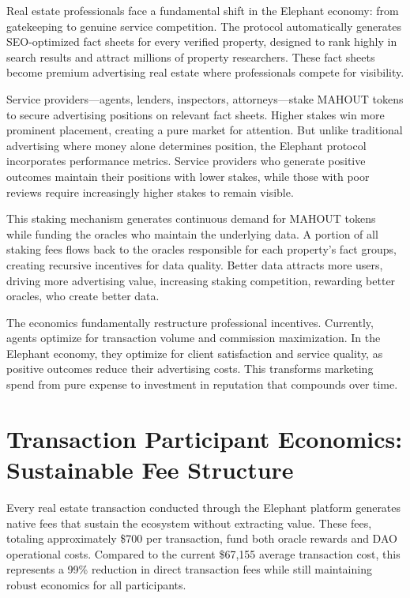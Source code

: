 Real estate professionals face a fundamental shift in the Elephant economy: from gatekeeping to genuine service competition. The protocol automatically generates SEO-optimized fact sheets for every verified property, designed to rank highly in search results and attract millions of property researchers. These fact sheets become premium advertising real estate where professionals compete for visibility.

Service providers—agents, lenders, inspectors, attorneys—stake MAHOUT tokens to secure advertising positions on relevant fact sheets. Higher stakes win more prominent placement, creating a pure market for attention. But unlike traditional advertising where money alone determines position, the Elephant protocol incorporates performance metrics. Service providers who generate positive outcomes maintain their positions with lower stakes, while those with poor reviews require increasingly higher stakes to remain visible.

This staking mechanism generates continuous demand for MAHOUT tokens while funding the oracles who maintain the underlying data. A portion of all staking fees flows back to the oracles responsible for each property's fact groups, creating recursive incentives for data quality. Better data attracts more users, driving more advertising value, increasing staking competition, rewarding better oracles, who create better data.

The economics fundamentally restructure professional incentives. Currently, agents optimize for transaction volume and commission maximization. In the Elephant economy, they optimize for client satisfaction and service quality, as positive outcomes reduce their advertising costs. This transforms marketing spend from pure expense to investment in reputation that compounds over time.

\section{Transaction Participant Economics: Sustainable Fee Structure}

Every real estate transaction conducted through the Elephant platform generates native fees that sustain the ecosystem without extracting value. These fees, totaling approximately \$700 per transaction, fund both oracle rewards and DAO operational costs. Compared to the current \$67,155 average transaction cost, this represents a 99\% reduction in direct transaction fees while still maintaining robust economics for all participants.

